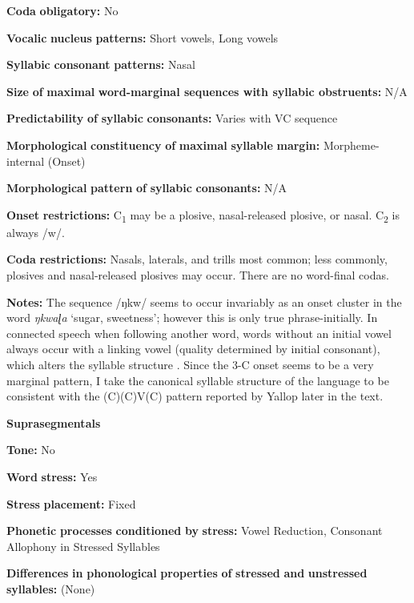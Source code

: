 \textbf{Coda} \textbf{obligatory:} No

\textbf{Vocalic} \textbf{nucleus} \textbf{patterns:} Short vowels, Long vowels

\textbf{Syllabic} \textbf{consonant} \textbf{patterns:} Nasal

\textbf{Size} \textbf{of} \textbf{maximal} \textbf{word{}-marginal sequences with syllabic obstruents:} N/A

\textbf{Predictability} \textbf{of} \textbf{syllabic} \textbf{consonants:} Varies with VC sequence

\textbf{Morphological} \textbf{constituency} \textbf{of} \textbf{maximal} \textbf{syllable} \textbf{margin:} Morpheme-internal (Onset)

\textbf{Morphological} \textbf{pattern} \textbf{of} \textbf{syllabic} \textbf{consonants:} N/A

\textbf{Onset} \textbf{restrictions:} C\textsubscript{1} may be a plosive, nasal-released plosive, or nasal. C\textsubscript{2} is always /w/.

\textbf{Coda} \textbf{restrictions:} Nasals, laterals, and trills most common; less commonly, plosives and nasal-released plosives may occur. There are no word-final codas.

\textbf{Notes:} The sequence /ŋkw/ seems to occur invariably as an onset cluster in the word \textit{ŋkwaɭa} ‘sugar, sweetness’; however this is only true phrase-initially. In connected speech when following another word, words without an initial vowel always occur with a linking vowel (quality determined by initial consonant), which alters the syllable structure \citep[28-30]{Yallop1977}. Since the 3-C onset seems to be a very marginal pattern, I take the canonical syllable structure of the language to be consistent with the (C)(C)V(C) pattern reported by Yallop later in the text.

\textbf{Suprasegmentals}

\textbf{Tone:} No

\textbf{Word} \textbf{stress:} Yes

\textbf{Stress} \textbf{placement:} Fixed

\textbf{Phonetic} \textbf{processes} \textbf{conditioned} \textbf{by} \textbf{stress:} Vowel Reduction, Consonant Allophony in Stressed Syllables

\textbf{Differences} \textbf{in} \textbf{phonological} \textbf{properties} \textbf{of} \textbf{stressed} \textbf{and} \textbf{unstressed} \textbf{syllables:} (None)


